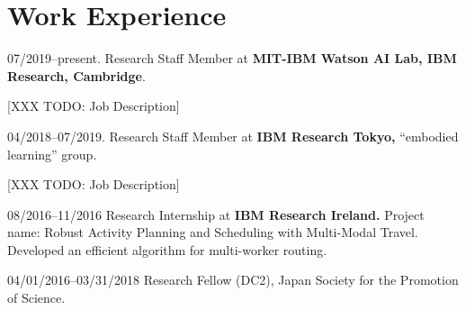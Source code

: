 \documentclass[letterpaper,11pt]{article}
\begin{document}
\section{Work Experience}

\begin{CV}
\item[07/2019--present.] Research Staff Member at \textbf{MIT-IBM Watson AI Lab, IBM Research, Cambridge}.

 [XXX TODO: Job Description]

\item[04/2018--07/2019.] Research Staff Member at \textbf{IBM Research Tokyo,} ``embodied learning'' group.

 [XXX TODO: Job Description]

\item[08/2016--11/2016] Research Internship at \textbf{IBM Research Ireland.}
 Project name: Robust Activity Planning and Scheduling with Multi-Modal Travel.
 Developed an efficient algorithm for multi-worker routing.

\item[04/01/2016--03/31/2018] Research Fellow (DC2), Japan Society for the Promotion of Science.




\end{CV}
\end{document}
